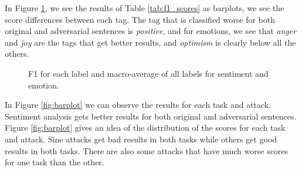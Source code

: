 \documentclass[11pt,a4paper]{article}
\begin{document}
In Figure \ref{fig:barplots}, we see the results of Table \ref{tab:f1_scores} as barplots, we see the score differences between each tag. The tag that is classified worse for both original and adversarial sentences is \textit{positive}, and for emotions, we see that \textit{anger} and \textit{joy} are the tags that get better results, and \textit{optimism} is clearly below all the others.

\begin{figure}[ht]
    \centering
    \caption{F1 for each label and macro-average of all labels for sentiment and emotion.}
    \label{fig:barplots}
\end{figure}

In Figure \ref{fig:barplot} we can observe the results for each task and attack. Sentiment analysis gets better results for both original and adversarial sentences. Figure \ref{fig:barplot} gives an idea of the distribution of the scores for each task and attack. Sine attacks get bad results in both tasks while others get good results in both tasks. There are also some attacks that have much worse scores for one task than the other.
\end{document}
